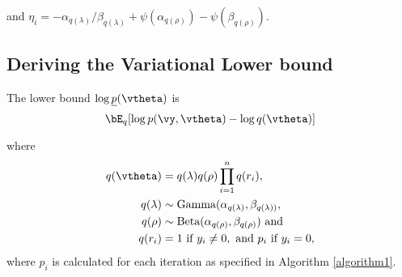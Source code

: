\noindent and $\eta_i = - \alpha_{q(\lambda)}/\beta_{q(\lambda)} + \psi(\alpha_{q(\rho)}) - \psi(\beta_{q(\rho)})$.
%
%
%
%
%
%
%
%
%


\subsection{Deriving the Variational Lower bound}
The lower bound $\log{\underline{p}(\vtheta)}$ is
$$
\bE_q[\log{p(\vy, \vtheta)} - \log{q(\vtheta)}]
$$

\noindent where
\begin{align*}
	q(\vtheta) &= q(\lambda) q(\rho) \prod_{i=1}^n q(r_i), \\
	q(\lambda) &\sim \text{Gamma}{(\alpha_{q(\lambda)}, \beta_{q(\lambda))}}, \\
	q(\rho) &\sim \text{Beta}(\alpha_{q(\rho)}, \beta_{q(\rho)}) \text{ and } \\
	q(r_i) &= 1 \text{ if } y_i \ne 0,\text{ and } p_i \text{ if } y_i = 0,
\end{align*}
where $p_i$ is calculated for each iteration as specified in Algorithm \ref{algorithm1}.


